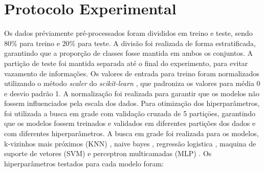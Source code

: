 \section{Protocolo Experimental}

Os dados préviamente pré-processados foram divididos em treino e teste, sendo 80\% para treino e 20\% para teste. A divisão foi realizada de forma estratificada, garantindo que a proporção de classes fosse mantida em ambos os conjuntos. A partição de teste foi mantida separada até o final do experimento, para evitar vazamento de informações. Os valores de entrada para treino foram normalizados utilizando o método \textit{scaler} do \textit{scikit-learn} \cite{kramer2016scikit}, que padroniza os valores para média 0 e desvio padrão 1. A normalização foi realizada para garantir que os modelos não fossem influenciados pela escala dos dados. Para otimização dos hiperparâmetros, foi utilizada a busca em grade \cite{feurer2019hyperparameter} com validação cruzada \cite{browne2000cross} de 5 partiçōes, garantindo que os modelos fossem treinados e validados em diferentes partições dos dados e com diferentes hiperparâmetros. A busca em grade foi realizada para os modelos,  k-vizinhos mais próximos (KNN) \cite{guo2003knn}, naive bayes \cite{webb2010naive}, regressão logistica \cite{lavalley2008logistic}, maquina de suporte de vetores (SVM) \cite{noble2006support} e perceptron multicamadas (MLP) \cite{gardner1998artificial}. Os hiperparâmetros testados para cada modelo foram:

